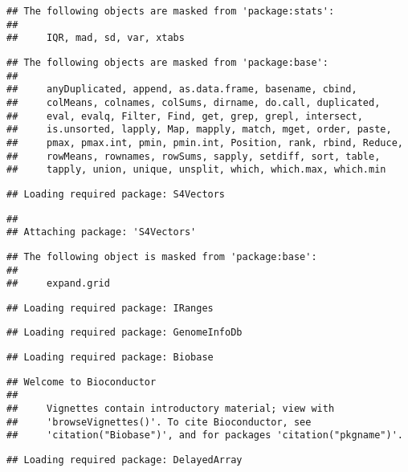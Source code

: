\documentclass[]{book}
\begin{document}
\begin{verbatim}
## The following objects are masked from 'package:stats':
## 
##     IQR, mad, sd, var, xtabs
\end{verbatim}

\begin{verbatim}
## The following objects are masked from 'package:base':
## 
##     anyDuplicated, append, as.data.frame, basename, cbind,
##     colMeans, colnames, colSums, dirname, do.call, duplicated,
##     eval, evalq, Filter, Find, get, grep, grepl, intersect,
##     is.unsorted, lapply, Map, mapply, match, mget, order, paste,
##     pmax, pmax.int, pmin, pmin.int, Position, rank, rbind, Reduce,
##     rowMeans, rownames, rowSums, sapply, setdiff, sort, table,
##     tapply, union, unique, unsplit, which, which.max, which.min
\end{verbatim}

\begin{verbatim}
## Loading required package: S4Vectors
\end{verbatim}

\begin{verbatim}
## 
## Attaching package: 'S4Vectors'
\end{verbatim}

\begin{verbatim}
## The following object is masked from 'package:base':
## 
##     expand.grid
\end{verbatim}

\begin{verbatim}
## Loading required package: IRanges
\end{verbatim}

\begin{verbatim}
## Loading required package: GenomeInfoDb
\end{verbatim}

\begin{verbatim}
## Loading required package: Biobase
\end{verbatim}

\begin{verbatim}
## Welcome to Bioconductor
## 
##     Vignettes contain introductory material; view with
##     'browseVignettes()'. To cite Bioconductor, see
##     'citation("Biobase")', and for packages 'citation("pkgname")'.
\end{verbatim}

\begin{verbatim}
## Loading required package: DelayedArray
\end{verbatim}
\end{document}
